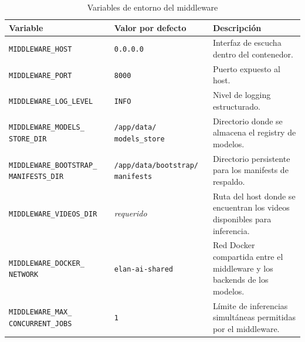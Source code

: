 \documentclass[11pt,a4paper]{article}
\begin{document}
\begin{table}[H]
\centering
\caption{Variables de entorno del middleware}
\label{tab:variables_entorno}
\scriptsize
\renewcommand{\arraystretch}{1.18}
\setlength{\tabcolsep}{5pt}

\begin{tabular}{
    >{\raggedright\arraybackslash}p{4.2cm}
    >{\raggedright\arraybackslash}p{3.4cm}
    >{\raggedright\arraybackslash}p{5.8cm}
}
\toprule
\textbf{Variable} & \textbf{Valor por defecto} & \textbf{Descripción} \\
\midrule

\texttt{MIDDLEWARE\_HOST} &
\texttt{0.0.0.0} &
Interfaz de escucha dentro del contenedor. \\

\texttt{MIDDLEWARE\_PORT} &
\texttt{8000} &
Puerto expuesto al host. \\

\texttt{MIDDLEWARE\_LOG\_LEVEL} &
\texttt{INFO} &
Nivel de logging estructurado. \\

\texttt{MIDDLEWARE\_MODELS\_}\newline
\texttt{STORE\_DIR} &
\texttt{/app/data/}\newline
\texttt{models\_store} &
Directorio donde se almacena el registry de modelos. \\

\texttt{MIDDLEWARE\_BOOTSTRAP\_}\newline
\texttt{MANIFESTS\_DIR} &
\texttt{/app/data/bootstrap/}\newline
\texttt{manifests} &
Directorio persistente para los manifests de respaldo. \\

\texttt{MIDDLEWARE\_VIDEOS\_DIR} &
\textit{requerido} &
Ruta del host donde se encuentran los videos disponibles para inferencia. \\

\texttt{MIDDLEWARE\_DOCKER\_}\newline
\texttt{NETWORK} &
\texttt{elan-ai-shared} &
Red Docker compartida entre el middleware y los backends de los modelos. \\

\texttt{MIDDLEWARE\_MAX\_}\newline
\texttt{CONCURRENT\_JOBS} &
\texttt{1} &
Límite de inferencias simultáneas permitidas por el middleware. \\

\bottomrule
\end{tabular}
\end{table}
\end{document}
